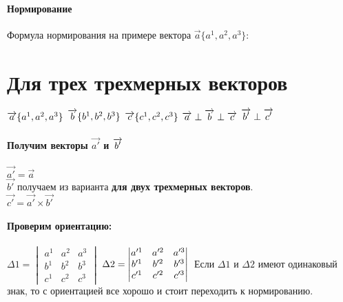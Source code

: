 \documentclass{book}
\begin{document}
\paragraph*{Нормирование}
Формула нормирования на примере вектора $\overrightarrow{a}\{a^1,a^2,a^3\}$:\\
\section{Для трех трехмерных векторов}
$\overrightarrow{a}\{a^1,a^2,a^3\}\\$
$\overrightarrow{b}\{b^1,b^2,b^3\}\\$
$\overrightarrow{c}\{c^1,c^2,c^3\}\\$
$\overrightarrow{a}\perp\overrightarrow{b}\perp\overrightarrow{c}\\$
$\overrightarrow{b'}\perp\overrightarrow{c'}\\$\\
\paragraph*{Получим векторы $\overrightarrow{a'}$ и $\overrightarrow{b'}\\$}
$\overrightarrow{a'}=\overrightarrow{a}$\\
$\overrightarrow{b'}$ получаем из варианта \textbf{для двух трехмерных векторов}.\\
$\overrightarrow{c'}=\overrightarrow{a'}\times\overrightarrow{b'}$
\paragraph*{Проверим ориентацию:\\}
$\Delta1=\begin{vmatrix}
    a^1 & a^2 & a^3\\
    b^1 & b^2 & b^3\\
    c^1 & c^2 & c^3
\end{vmatrix}
$
$\Delta2=\begin{vmatrix}
    a'^1 & a'^2 & a'^3\\
    b'^1 & b'^2 & b'^3\\
    c'^1 & c'^2 & c'^3
\end{vmatrix}
\\$
Если $\Delta1$ и $\Delta2$ имеют одинаковый знак, то с ориентацией все хорошо и стоит переходить к нормированию.
\end{document}
